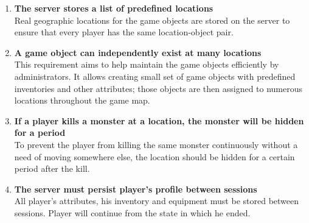 \begin{enumerate}
			\item \textbf{The server stores a list of predefined locations} \\	
			Real geographic locations for the game objects are stored on the server to ensure that every player has the same location-object pair. 
								
			\item \textbf{A game object can independently exist at many locations} \\
			This requirement aims to help maintain the game objects efficiently by administrators. It allows creating small set of game objects with predefined inventories and other attributes; those objects are then assigned to numerous locations throughout the game map.
			
			\item \textbf{If a player kills a monster at a location, the monster will be hidden for a period} \\
			To prevent the player from killing the same monster continuously without a need of moving somewhere else, the location should be hidden for a certain period after the kill.						
					
			\item \textbf{The server must persist player’s profile between sessions} \\
			All player's attributes, his inventory and equipment must be stored between sessions. Player will continue from the state in which he ended.
			
		\end{enumerate}

